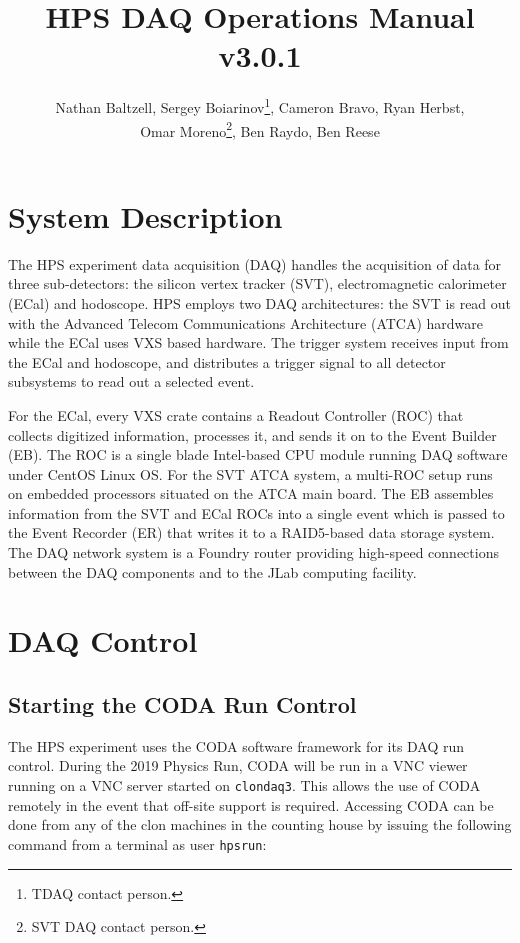 \documentclass[12pt]{article}
\title{HPS DAQ Operations Manual v3.0.1}
\author{Nathan Baltzell, Sergey Boiarinov\thanks{TDAQ contact person.},
        Cameron Bravo, Ryan Herbst, \\ Omar Moreno\thanks{SVT DAQ contact person.}, 
        Ben Raydo, Ben Reese}
\begin{document}
\maketitle

\tableofcontents

\newpage
\section{System Description}
The HPS experiment data acquisition (DAQ) handles the acquisition of data for
three sub-detectors: the silicon vertex tracker (SVT), electromagnetic calorimeter
(ECal) and hodoscope. HPS employs two DAQ architectures: the SVT is read out 
with the Advanced Telecom Communications Architecture (ATCA) hardware while the
ECal uses VXS based hardware. The trigger system receives input from the ECal
and hodoscope, and distributes a trigger signal to all detector subsystems to
read out a selected event. 

For the ECal, every VXS crate contains a Readout Controller (ROC) that collects digitized information, processes it, and sends it on to the Event Builder (EB). The ROC is a single blade Intel-based CPU module running DAQ software under CentOS Linux OS. For the SVT ATCA system, a multi-ROC setup runs on embedded processors situated on the ATCA main board. The EB assembles information from the SVT and ECal ROCs into a single event which is passed to the Event Recorder (ER) that writes it to a RAID5-based data storage system. The DAQ network system is a Foundry router providing high-speed connections between the DAQ components and to the JLab computing facility. 

\newpage
\section{DAQ Control}
\label{sec:daq_control}

\subsection{Starting the CODA Run Control}\label{sec:daqstart}

The HPS experiment uses the CODA software framework for its DAQ run control. 
During the 2019 Physics Run, CODA will be run in a VNC viewer running on a 
VNC server started on \texttt{clondaq3}.  This allows the use of CODA remotely
in the event that off-site support is required.  Accessing CODA can be done 
from any of the clon machines in the counting house by issuing the following
command from a terminal as user \texttt{hpsrun}: \newline
\end{document}

